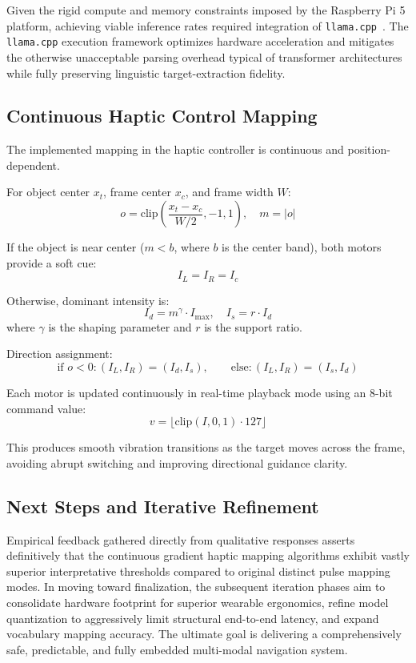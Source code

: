 \documentclass{article}
\begin{document}
Given the rigid compute and memory constraints imposed by the Raspberry Pi 5 platform, achieving viable inference rates required integration of \texttt{llama.cpp}~\cite{gerganov2023llama}. The \texttt{llama.cpp} execution framework optimizes hardware acceleration and mitigates the otherwise unacceptable parsing overhead typical of transformer architectures while fully preserving linguistic target-extraction fidelity.

\subsection{Continuous Haptic Control Mapping}

The implemented mapping in the haptic controller is continuous and position-dependent.

For object center $x_t$, frame center $x_c$, and frame width $W$:
\[
o = \text{clip}\left(\frac{x_t - x_c}{W/2}, -1, 1\right), \quad m = |o|
\]

If the object is near center ($m < b$, where $b$ is the center band), both motors provide a soft cue:
\[
I_L = I_R = I_c
\]

Otherwise, dominant intensity is:
\[
I_d = m^{\gamma} \cdot I_{\max}, \quad I_s = r \cdot I_d
\]
where $\gamma$ is the shaping parameter and $r$ is the support ratio.

Direction assignment:
\[
\text{if } o < 0: (I_L, I_R) = (I_d, I_s), \qquad
\text{else}: (I_L, I_R) = (I_s, I_d)
\]

Each motor is updated continuously in real-time playback mode using an 8-bit command value:
\[
v = \lfloor \text{clip}(I, 0, 1) \cdot 127 \rfloor
\]

This produces smooth vibration transitions as the target moves across the frame, avoiding abrupt switching and improving directional guidance clarity.

\subsection{Next Steps and Iterative Refinement}

Empirical feedback gathered directly from qualitative responses asserts definitively that the continuous gradient haptic mapping algorithms exhibit vastly superior interpretative thresholds compared to original distinct pulse mapping modes. In moving toward finalization, the subsequent iteration phases aim to consolidate hardware footprint for superior wearable ergonomics, refine model quantization to aggressively limit structural end-to-end latency, and expand vocabulary mapping accuracy. The ultimate goal is delivering a comprehensively safe, predictable, and fully embedded multi-modal navigation system.
 
\end{document}
